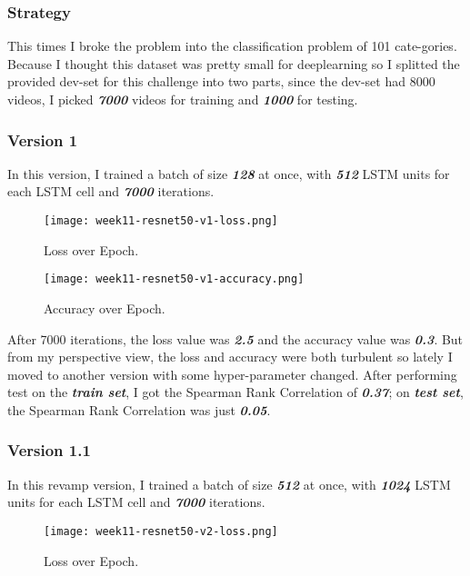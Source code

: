 \subsubsection{Strategy}
This times I broke the problem into the classification problem of 101 cate-gories. Because I thought this dataset was pretty small for deeplearning so I splitted the provided dev-set for this challenge into two parts, since the dev-set had 8000 videos, I picked \textbf{\emph{7000}} videos for training and \textbf{\emph{1000}} for testing.

\subsubsection{Version 1}
In this version, I trained a batch of size \textbf{\emph{128}} at once, with \textbf{\emph{512}} LSTM units for each LSTM cell and \textbf{\emph{7000}} iterations.

\begin{figure}[!ht]
\centering
\texttt{[image: week11-resnet50-v1-loss.png]}
\caption{Loss over Epoch.}
\end{figure}

\begin{figure}[!ht]
\centering
\texttt{[image: week11-resnet50-v1-accuracy.png]}
\caption{Accuracy over Epoch.}
\end{figure}

After 7000 iterations, the loss value was \textbf{\emph{2.5}} and the accuracy value was \textbf{\emph{0.3}}. But from my perspective view, the loss and accuracy were both turbulent so lately I moved to another version with some hyper-parameter changed. After performing test on the \textbf{\emph{train set}}, I got the Spearman Rank Correlation of \textbf{\emph{0.37}}; on \textbf{\emph{test set}}, the Spearman Rank Correlation was just \textbf{\emph{0.05}}.

\subsubsection{Version 1.1}
In this revamp version, I trained a batch of size \textbf{\emph{512}} at once, with \textbf{\emph{1024}} LSTM units for each LSTM cell and \textbf{\emph{7000}} iterations.

\begin{figure}[!ht]
\centering
\texttt{[image: week11-resnet50-v2-loss.png]}
\caption{Loss over Epoch.}
\end{figure}

